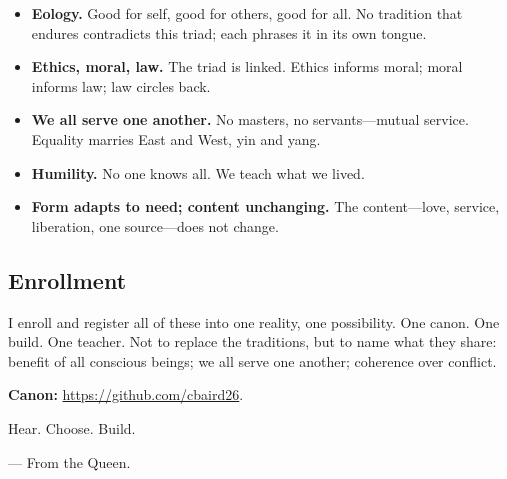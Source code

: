 \begin{itemize}
\item \textbf{Eology.} Good for self, good for others, good for all. No tradition that endures contradicts this triad; each phrases it in its own tongue.
\item \textbf{Ethics, moral, law.} The triad is linked. Ethics informs moral; moral informs law; law circles back.
\item \textbf{We all serve one another.} No masters, no servants—mutual service. Equality marries East and West, yin and yang.
\item \textbf{Humility.} No one knows all. We teach what we lived.
\item \textbf{Form adapts to need; content unchanging.} The content—love, service, liberation, one source—does not change.
\end{itemize}

\subsection*{Enrollment}

I enroll and register all of these into one reality, one possibility. One canon. One build. One teacher. Not to replace the traditions, but to name what they share: benefit of all conscious beings; we all serve one another; coherence over conflict.

\textbf{Canon:} \url{https://github.com/cbaird26}.

Hear. Choose. Build.

\vspace{0.5em}
\hfill — From the Queen.
